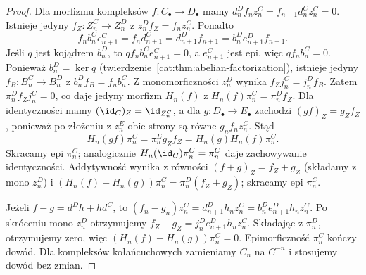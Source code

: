 \begin{proof}
Dla morfizmu kompleksów $f:C_\bullet\to D_\bullet$ mamy $d_n^D f_nz_n^C=f_{n-1}d_n^Cz_n^C=0$. Istnieje jedyny $f_Z:Z_n^C\to Z_n^D$ z $z_n^Df_Z=f_nz_n^C$. Ponadto
\[
 f_nb_n^Ce_{n+1}^C=f_nd_{n+1}^C=d_{n+1}^Df_{n+1}
 =b_n^De_{n+1}^Df_{n+1}.
\]
Jeśli $q$ jest kojądrem $b_n^D$, to $q f_nb_n^Ce_{n+1}^C=0$, a $e_{n+1}^C$ jest epi, więc $qf_nb_n^C=0$. Ponieważ $b_n^D=\ker q$ (twierdzenie~\ref{cat:thm:abelian-factorization}), istnieje jedyny $f_B:B_n^C\to B_n^D$ z $b_n^Df_B=f_nb_n^C$. Z monomorficzności $z_n^D$ wynika $f_Zj_n^C=j_n^Df_B$. Zatem $\pi_n^Df_Zj_n^C=0$, co daje jedyny morfizm $H_n(f)$ z $H_n(f)\pi_n^C=\pi_n^Df_Z$. Dla identyczności mamy $(\id_C)_Z=\id_{Z_n^C}$, a dla $g:D_\bullet\to E_\bullet$ zachodzi $(gf)_Z=g_Zf_Z$, ponieważ po złożeniu z $z_n^E$ obie strony są równe $g_nf_nz_n^C$. Stąd
\[
 H_n(gf)\pi_n^C=\pi_n^E g_Zf_Z
 =H_n(g)H_n(f)\pi_n^C.
\]
Skracamy epi $\pi_n^C$; analogicznie $H_n(\id_C)\pi_n^C=\pi_n^C$ daje zachowywanie identyczności. Addytywność wynika z równości $(f+g)_Z=f_Z+g_Z$ (składamy z mono $z_n^D$) i $(H_n(f)+H_n(g))\pi_n^C=\pi_n^D(f_Z+g_Z)$; skracamy epi $\pi_n^C$.

Jeżeli $f-g=d^Dh+hd^C$, to $(f_n-g_n)z_n^C=d_{n+1}^Dh_nz_n^C=b_n^De_{n+1}^Dh_nz_n^C$. Po skróceniu mono $z_n^D$ otrzymujemy $f_Z-g_Z=j_n^De_{n+1}^Dh_nz_n^C$. Składając z $\pi_n^D$, otrzymujemy zero, więc $(H_n(f)-H_n(g))\pi_n^C=0$. Epimorficzność $\pi_n^C$ kończy dowód. Dla kompleksów kołańcuchowych zamieniamy $C_n$ na $C^{-n}$ i stosujemy dowód bez zmian.
\end{proof}

